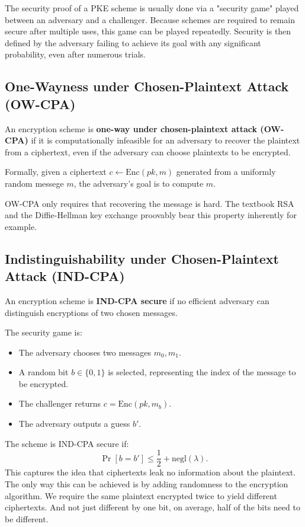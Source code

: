 The security proof of a PKE scheme is usually done via a "security game" played between an adversary and a challenger. Because schemes are required to remain secure after multiple uses, this game can be played repeatedly. Security is then defined by the adversary failing to achieve its goal with any significant probability, even after numerous trials.

\subsection{One-Wayness under Chosen-Plaintext Attack (OW-CPA)}

An encryption scheme is \textbf{one-way under chosen-plaintext attack (OW-CPA)} if it is computationally infeasible for an adversary to recover the plaintext from a ciphertext, even if the adversary can choose plaintexts to be encrypted.

Formally, given a ciphertext $c \leftarrow \text{Enc}(pk, m)$ generated from a uniformly random messege \(m\), the adversary’s goal is to compute \(m\).

OW-CPA only requires that recovering the message is hard. The textbook RSA and the Diffie-Hellman key exchange proovably bear this property inherently for example.

\subsection{Indistinguishability under Chosen-Plaintext Attack (IND-CPA)}

An encryption scheme is \textbf{IND-CPA secure} if no efficient adversary can distinguish encryptions of two chosen messages.

The security game is:
\begin{itemize}
    \item The adversary chooses two messages \(m_0, m_1\).
    \item A random bit \(b \in \{0,1\}\) is selected, representing the index of the message to be encrypted.
    \item The challenger returns \(c = \text{Enc}(pk, m_b)\).
    \item The adversary outputs a guess \(b'\).
\end{itemize}

The scheme is IND-CPA secure if:
\[
\Pr[b = b'] \leq \frac{1}{2} + \text{negl}(\lambda).
\]
This captures the idea that ciphertexts leak no information about the plaintext. The only way this can be achieved is by adding randomness to the encryption algorithm. We require the same plaintext encrypted twice to yield different ciphertexts. And not just different by one bit, on average, half of the bits need to be different.

